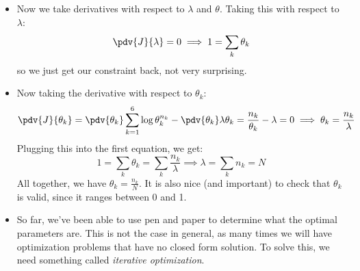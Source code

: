 \begin{itemize}
	\item Now we take derivatives with respect to \( \lambda \) and \( \theta \).
		Taking this with respect to \( \lambda \):
		\[
			\pdv{J}{\lambda} = 0 \implies 1 = \sum_k \theta_k
		\]
		so we just get our constraint back, not very surprising. 
	\item Now taking the derivative with respect to \( \theta_k \):
		\[
			\pdv{J}{\theta_k} = \pdv{\theta_k} \sum_{k = 1}^{6}\log \theta_k^{n_k} -
			\pdv{\theta_k} \lambda \theta_k = \frac{n_k}{\theta_k} - \lambda = 0
			\implies \theta_k = \frac{n_k}{\lambda}
		\]
		Plugging this into the first equation, we get:
		\[
			1 = \sum_k \theta_k = \sum_k \frac{n_k}{\lambda} \implies \lambda =
			\sum_k n_k = N
		\]
		All together, we have \( \theta_k = \frac{n_k}{N} \). It is also nice (and
		important) to check that \( \theta_k \) is valid, since it ranges between 0
		and 1.  

	\item So far, we've been able to use pen and paper to determine what the optimal
		parameters are. This is not the case in general, as many times we will have
		optimization problems that have no closed form solution. To solve this, we
		need something called \textit{iterative optimization}.  
\end{itemize}
